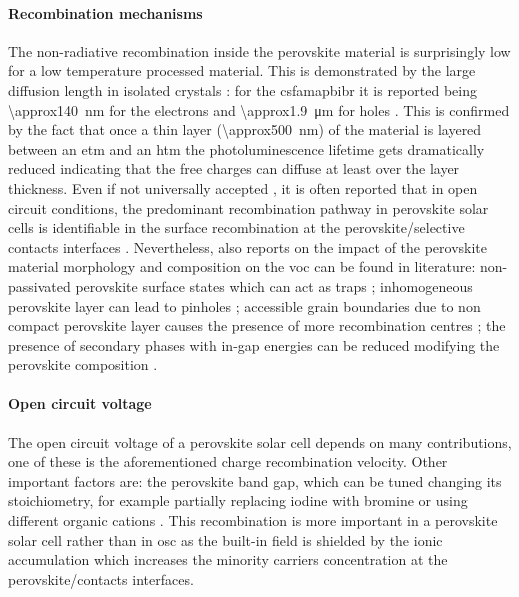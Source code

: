 	\paragraph{Recombination mechanisms}
The non-radiative recombination inside the perovskite material is surprisingly low for a low temperature processed material. This is demonstrated by the large diffusion length in isolated crystals \cite{Wehrenfennig2014,Wehrenfennig2014a,Stranks2013,Xing2013,Shi2015a,Eperon2014}: for the \gls{csfamapbibr} it is reported being \SI{\approx140}{\nm} for the electrons and \SI{\approx1.9}{\um} for holes \cite{Liu2017}.
This is confirmed by the fact that once a thin layer (\SI{\approx500}{\nm}) of the material is layered between an \gls{etm} and an \gls{htm} the photoluminescence lifetime gets dramatically reduced \cite{Jimenez-Lopez2017,Eperon2014} indicating that the free charges can diffuse at least over the layer thickness.
Even if not universally accepted \cite{Valadez-Villalobos2019}, it is often reported that in open circuit conditions, the predominant recombination pathway in perovskite solar cells is identifiable in the surface recombination at the perovskite/selective contacts interfaces \cite{Calado2018b,Stolterfoht2018a,Stolterfoht2018,Gelmetti2019,Shao2016}.
Nevertheless, also reports on the impact of the perovskite material morphology and composition on the \gls{voc} can be found in literature: non-passivated perovskite surface states which can act as traps \cite{Zheng2017}; inhomogeneous perovskite layer can lead to pinholes \cite{Lee2015,Montcada2017,Qiu2016}; accessible grain boundaries due to non compact perovskite layer causes the presence of more recombination centres \cite{Shao2016a}; the presence of secondary phases with in-gap energies can be reduced modifying the perovskite composition \cite{Bi2016}.

	\paragraph{Open circuit voltage}
The open circuit voltage of a perovskite solar cell depends on many contributions, one of these is the aforementioned charge recombination velocity. Other important factors are: the perovskite band gap, which can be tuned changing its stoichiometry, for example partially replacing iodine with bromine \cite{McMeekin2016,Noh2013a,Wheeler2017} or using different organic cations \cite{Eperon2014}.
This recombination is more important in a perovskite solar cell rather than in \gls{osc} as the built-in field is shielded by the ionic accumulation which increases the minority carriers concentration at the perovskite/contacts interfaces.

